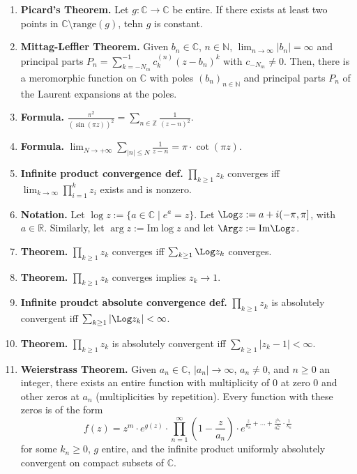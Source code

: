 \begin{enumerate}
	\item \textbf{Picard's Theorem. } Let $g: \mathbb{C} \to \mathbb{C}$ be entire. If there exists at least two points in $\mathbb{C} \setminus \textrm{range}(g)$, tehn $g$ is constant. 
	\item \textbf{Mittag-Leffler Theorem. } Given $b_n \in \mathbb{C}$, $n \in \mathbb{N}$, $\lim_{n \to \infty} |b_n| = \infty$ and principal parts $P_n = \sum_{k=-N_m}^{-1} c_k^{(n)}(z-b_n)^k$ with $c_{-N_m} \neq 0$. Then, there is a meromorphic function on $\mathbb{C}$ with poles $(b_n)_{n \in \mathbb{N}}$ and principal parts $P_n$ of the Laurent expansions at the poles. 
	\item \textbf{Formula. } $\frac{\pi^2}{(\sin(\pi z))^2} = \sum_{n \in \mathbb{Z}} \frac{1}{(z-n)^2}$. 
	\item \textbf{Formula. } $\lim_{N \to +\infty} \sum_{|n| \leq N} \frac{1}{z-n} = \pi \cdot \cot(\pi z)$. 
	\item \textbf{Infinite product convergence def. } $\prod_{k \geq 1} z_k$ converges iff $\lim_{k \to \infty} \prod_{i=1}^{k}z_i$ exists and is nonzero. 
	\item \textbf{Notation. } Let $\log z := \{a \in \mathbb{C} \mid e^a = z\}$. Let $\Log z := a + i(-\pi,\pi]$, with $a \in \mathbb{R}$. Similarly, let $\arg z := \textrm{Im} \log z$ and let $\Arg z := \textrm{Im} \Log z$. 
	\item \textbf{Theorem. } $\prod_{k \geq 1}z_k$ converges iff $\sum_{k \geq 1} \Log z_k$ converges. 
	\item \textbf{Theorem. } $\prod_{k \geq 1} z_k$ converges implies $z_k \to 1$. 
	\item \textbf{Infinite proudct absolute convergence def. } $\prod_{k \geq 1}z_k$ is absolutely convergent iff $\sum_{k \geq 1} |\Log z_k| < \infty$. 
	\item \textbf{Theorem. } $\prod_{k \geq 1}z_k$ is absolutely convergent iff $\sum_{k \geq 1} |z_k - 1| < \infty$. 
	\item \textbf{Weierstrass Theorem. } Given $a_n \in \mathbb{C}$, $|a_n| \to \infty$, $a_n \neq 0$, and $n \geq 0$ an integer, there exists an entire function with multiplicity of 0 at zero 0 and other zeros at $a_n$ (multiplicities by repetition). Every function with these zeros is of the form 
	$$
	f(z) = z^m \cdot e^{g(z)} \cdot \prod_{n = 1}^{\infty} \left(1 - \frac{z}{a_n}\right) \cdot e^{\frac{z}{a_n} + \dots + \frac{z^{k_n}}{a_n^{k_n}} \cdot \frac{1}{k_n}}
	$$
	for some $k_n \geq 0$, $g$ entire, and the infinite product uniformly absolutely convergent on compact subsets of $\mathbb{C}$. 

\end{enumerate}
